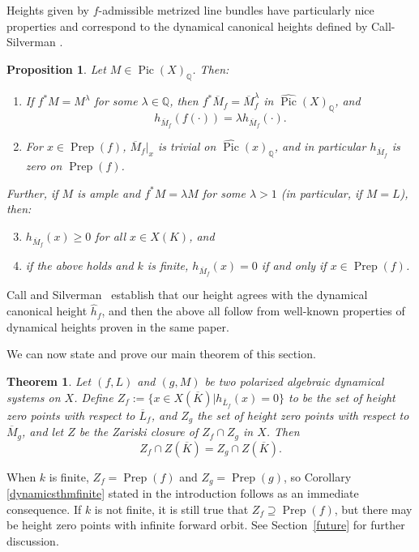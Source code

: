 \documentclass[times, doublespace]{amsart}
\numberwithin{equation}{section}
\theoremstyle{plain}
\newtheorem{theorem}[equation]{Theorem}
\newtheorem{proposition}[equation]{Proposition}
\theoremstyle{definition}
\DeclareMathOperator{\Pic}{Pic}
\DeclareMathOperator{\Prep}{Prep}
\newcommand{\Q}{\mathbb{Q}}
\begin{document}
Heights given by $f$-admissible metrized line bundles have particularly nice properties and correspond to the dynamical canonical heights defined by Call-Silverman \cite{CS}.
\begin{proposition}\label{canonicalheights}
Let $ M\in\Pic(X)_{\Q}$. Then:
\begin{enumerate}
\item
If $f^*M= M^\lambda$ for some $\lambda\in\Q$, then $f^*\overline M_f= \overline M_f^\lambda$ in $\widehat{\Pic}(X)_{\Q}$, and 
\[ h_{\overline M_f}(f(\cdot))=\lambda h_{\overline M_f}(\cdot).\]
\item
For $x\in\Prep(f)$, $\overline M_f|_x$ is trivial on $\widehat{\Pic}(x)_{\Q}$, and in particular $h_{\overline M_f}$ is zero on $\Prep(f)$.
\end{enumerate}
Further, if $M$ is ample and $f^*M=\lambda M$ for some $\lambda>1$ (in particular, if $M=L$), then:
\begin{enumerate}
\setcounter{enumi}{2}

\item
$h_{\overline M_f}(x)\ge0$ for all $x\in X(K)$, and
\item
if the above holds and $k$ is finite, $h_{\overline M_f}(x)=0$ if and only if $x\in\Prep(f)$.

\end{enumerate}
\end{proposition}
Call and Silverman~\cite{CS} establish that our height agrees with the dynamical canonical height $\widehat h_f$, and then the above all follow from well-known properties of dynamical heights proven in the same paper.

We can now state and prove our main theorem of this section.
\begin{theorem}\label{dynamicsthm}
Let $(f,L)$ and $(g,M)$ be two polarized algebraic dynamical systems on $X$. Define $Z_f:=\{x\in X(\overline K)|h_{\overline L_f}(x)=0\}$ to be the set of height zero points with respect to $\overline L_f$, and $Z_g$ the set of height zero points with respect to $\overline M_g$, and let $Z$ be the Zariski closure of $Z_f\cap Z_g$ in $X$. Then
\[ Z_f\cap Z(\overline K)=Z_g\cap Z(\overline K).\]
\end{theorem}

When $k$ is finite, $Z_f=\Prep(f)$ and $Z_g=\Prep(g)$, so Corollary \ref{dynamicsthmfinite} stated in the introduction follows as an immediate consequence. If $k$ is not finite, it is still true that $Z_f\supseteq\Prep(f)$, but there may be height zero points with infinite forward orbit. See Section~\ref{future} for further discussion.
\end{document}
